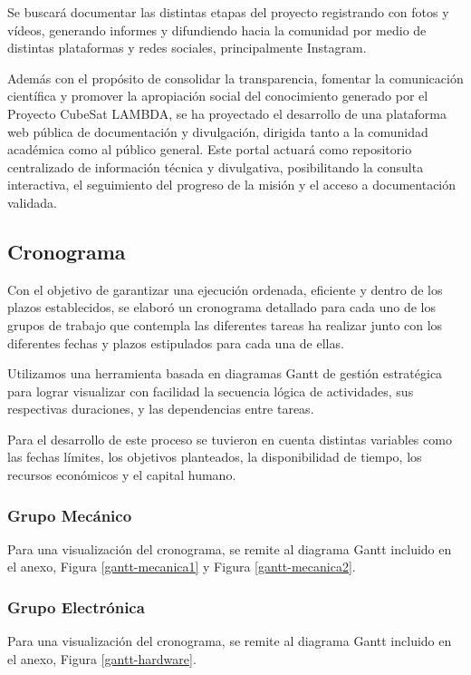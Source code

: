 \begin{itemize}
          Se buscará documentar las distintas etapas del proyecto registrando con
          fotos y vídeos, generando informes y difundiendo hacia la comunidad por medio de distintas plataformas y redes
          sociales, principalmente Instagram.

          Además con el propósito de consolidar la transparencia, fomentar la comunicación científica y promover la apropiación
          social del conocimiento generado por el Proyecto CubeSat LAMBDA, se ha proyectado el desarrollo de una plataforma
          web pública de documentación y divulgación, dirigida tanto a la comunidad académica como al público general. Este
          portal actuará como repositorio centralizado de información técnica y divulgativa, posibilitando la consulta
          interactiva, el seguimiento del progreso de la misión y el acceso a documentación validada.
        \end{itemize}
 
  \subsection{Cronograma}
    Con el objetivo de garantizar una ejecución ordenada, eficiente y dentro de los plazos establecidos, se elaboró un
    cronograma detallado para cada uno de los grupos de trabajo que contempla las diferentes tareas ha realizar junto
    con los diferentes fechas y plazos estipulados para cada una de ellas.

    Utilizamos una herramienta basada en diagramas Gantt de gestión estratégica para lograr visualizar con facilidad la
    secuencia lógica de actividades, sus respectivas duraciones, y las dependencias entre tareas.

    Para el desarrollo de este proceso se tuvieron en cuenta distintas variables como las fechas límites, los objetivos
    planteados, la disponibilidad de tiempo, los recursos económicos y el capital humano.

    \subsubsection{Grupo Mecánico}
    Para una visualización del cronograma, se remite al diagrama Gantt incluido en el anexo, Figura
    \ref{gantt-mecanica1} y Figura \ref{gantt-mecanica2}.
    \subsubsection{Grupo Electrónica}
    Para una visualización del cronograma, se remite al diagrama Gantt incluido en el anexo, Figura
    \ref{gantt-hardware}.
